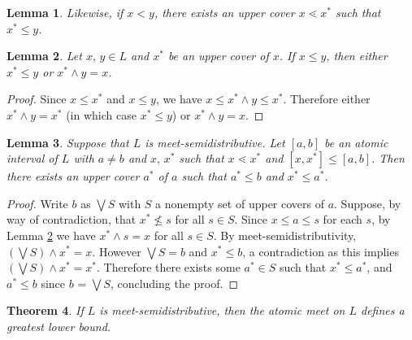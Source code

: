 \documentclass{article}
\newtheorem{theorem}{Theorem}[section]
\newtheorem{lemma}[theorem]{Lemma}
\begin{document}
\begin{lemma} Likewise, if $x < y$, there exists an upper cover $x \lessdot x^*$ such that $x^* \le y$.
\end{lemma}

\begin{lemma} \label{Lemma 2.3} Let $x,\, y \in L$ and $x^*$ be an upper cover of $x$. If $x \le y$, then either $x^* \le y$ or $x^* \wedge y = x$.
\end{lemma}
\begin{proof}
    Since $x \le x^*$ and $x \le y$, we have $x \le x^* \wedge y \le x^*$. Therefore either $x^* \wedge y = x^*$ (in which case $x^* \le y$) or $x^* \wedge y = x$.
\end{proof}

\begin{lemma} \label {Lemma 2.4} Suppose that $L$ is meet-semidistributive. Let $[a, b]$ be an atomic interval of $L$ with $a \ne b$ and $x,\, x^*$ such that $x \lessdot x^*$ and $[x, x^*] \le [a, b]$. Then there exists an upper cover $a^*$ of $a$ such that $a^* \le b$ and $x^* \le a^*$.
\end{lemma}
\begin{proof}
    Write $b$ as $\bigvee S$ with $S$ a nonempty set of upper covers of $a$. Suppose, by way of contradiction, that $x^* \not \le s$ for all $s \in S$. Since $x \le a \le s$ for each $s$, by Lemma \ref{Lemma 2.3} we have $x^* \wedge s = x$ for all $s \in S$. By meet-semidistributivity, $(\bigvee S) \wedge x^* = x$. However $\bigvee S = b$ and $x^* \le b$, a contradiction as this implies $(\bigvee S) \wedge x^* = x^*$. Therefore there exists some $a^* \in S$ such that $x^* \le a^*$, and $a^* \le b$ since $b$ = $\bigvee S$, concluding the proof.
\end{proof}

\begin{theorem} If $L$ is meet-semidistributive, then the atomic meet on $L$ defines a greatest lower bound.
\end{theorem}
\end{document}
